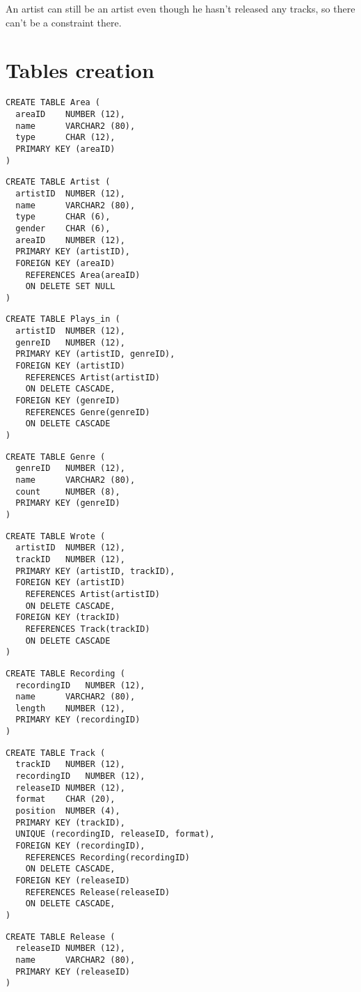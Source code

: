 \documentclass[a4paper,10pt]{article}
\begin{document}
An artist can still be an artist even though he hasn't released any tracks, so there can't be a constraint there.\\
\section{Tables creation}
\lstset{language=SQL}
\begin{lstlisting}[frame=single, float=h]
CREATE TABLE Area (
  areaID	NUMBER (12),
  name		VARCHAR2 (80),
  type		CHAR (12),
  PRIMARY KEY (areaID)
)
\end{lstlisting}
\begin{lstlisting}[frame=single, float=h]
CREATE TABLE Artist (
  artistID	NUMBER (12),
  name		VARCHAR2 (80),
  type		CHAR (6),
  gender	CHAR (6),
  areaID	NUMBER (12),
  PRIMARY KEY (artistID),
  FOREIGN KEY (areaID)
    REFERENCES Area(areaID)
    ON DELETE SET NULL
)
\end{lstlisting}
\begin{lstlisting}[frame=single, float=h]
CREATE TABLE Plays_in (
  artistID	NUMBER (12),
  genreID	NUMBER (12),
  PRIMARY KEY (artistID, genreID),
  FOREIGN KEY (artistID)
    REFERENCES Artist(artistID)
    ON DELETE CASCADE,
  FOREIGN KEY (genreID)
    REFERENCES Genre(genreID)
    ON DELETE CASCADE
)
\end{lstlisting}
\begin{lstlisting}[frame=single, float=h]
CREATE TABLE Genre (
  genreID	NUMBER (12),
  name		VARCHAR2 (80),
  count		NUMBER (8),
  PRIMARY KEY (genreID)
)
\end{lstlisting}
\begin{lstlisting}[frame=single, float=h]
CREATE TABLE Wrote (
  artistID	NUMBER (12),
  trackID	NUMBER (12),
  PRIMARY KEY (artistID, trackID),
  FOREIGN KEY (artistID)
    REFERENCES Artist(artistID)
    ON DELETE CASCADE,
  FOREIGN KEY (trackID)
    REFERENCES Track(trackID)
    ON DELETE CASCADE
)
\end{lstlisting}
\begin{lstlisting}[frame=single, float=h]
CREATE TABLE Recording (
  recordingID	NUMBER (12),
  name		VARCHAR2 (80),
  length	NUMBER (12),
  PRIMARY KEY (recordingID)
)
\end{lstlisting}
\begin{lstlisting}[frame=single, float=h]
CREATE TABLE Track (
  trackID	NUMBER (12),
  recordingID	NUMBER (12),
  releaseID	NUMBER (12),
  format	CHAR (20),
  position	NUMBER (4),
  PRIMARY KEY (trackID),
  UNIQUE (recordingID, releaseID, format),
  FOREIGN KEY (recordingID),
    REFERENCES Recording(recordingID)
    ON DELETE CASCADE,
  FOREIGN KEY (releaseID)
    REFERENCES Release(releaseID)
    ON DELETE CASCADE,
)
\end{lstlisting}
\begin{lstlisting}[frame=single, float=h]
CREATE TABLE Release (
  releaseID	NUMBER (12),
  name		VARCHAR2 (80),
  PRIMARY KEY (releaseID)
)
\end{lstlisting}
\end{document}
